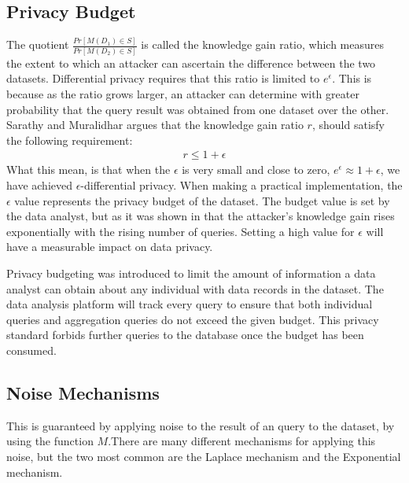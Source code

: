 \subsection{Privacy Budget}
The quotient $\frac{Pr[M(D_1)\in S]}{Pr[M(D_2)\in S]}$ is called the knowledge gain ratio, which measures the extent to which an attacker can ascertain the difference between the two datasets\cite{abowd2008protective}. Differential privacy requires that this ratio is limited to $e^\epsilon$. This is because as the ratio grows larger, an attacker can determine with greater probability that the query result was obtained from one dataset over the other. Sarathy and Muralidhar\cite{Sarathy2011evaluating} argues that the knowledge gain ratio $r$, should satisfy the following requirement: 
\begin{eqnarray} \label{KnowledgeRatioBound}
	r \leq 1+\epsilon
 \end{eqnarray}
 What this mean, is that when the $\epsilon$ is very small and close to zero, $e^\epsilon \approx 1+\epsilon$, we have achieved $\epsilon$-differential privacy. When making a practical implementation, the $\epsilon$ value represents the privacy budget of the dataset. The budget value is set by the data analyst, but as it was shown in \cite{Sarathy2011evaluating} that the attacker's knowledge gain rises exponentially with the rising number of queries. Setting a high value for $\epsilon$ will have a measurable impact on data privacy. 
 
 Privacy budgeting was introduced to limit the amount of information a data analyst can obtain about any individual with data records in the dataset. The data analysis platform will track every query to ensure that both individual queries and aggregation queries do not exceed the given budget. This privacy standard forbids further queries to the database once the budget has been consumed. 
 
\subsection{Noise Mechanisms}
This is guaranteed by applying noise to the result of an query to the dataset, by using the function $M$.There are many different mechanisms for applying this noise, but the two most common are the Laplace mechanism and the Exponential mechanism. 


